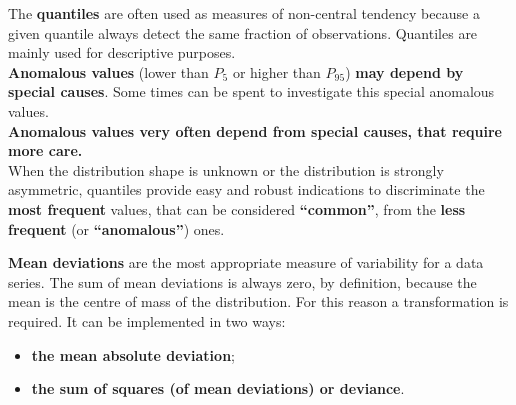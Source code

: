 \begin{frame}
  \begin{small}
    \vspace*{.3cm}
    The \textbf{quantiles} are often used as measures of non-central tendency because a given quantile always detect the same fraction of observations. Quantiles are mainly used for descriptive purposes.\\
    \vspace*{.3cm}
    \textbf{Anomalous values} (lower than $P_5$ or higher than $P_{95}$) \textbf{may depend by special causes}. Some times can be spent to investigate this special anomalous values. \\
    \vspace*{.3cm}
    \textbf{Anomalous values very often depend from special causes, that require more care.}\\
    \vspace*{.3cm}
    When the distribution shape is unknown or the distribution is strongly asymmetric, quantiles provide easy and robust indications to discriminate the \textbf{most frequent} values, that can be considered \textbf{``common''}, from the \textbf{less frequent} (or \textbf{``anomalous''}) ones.
  \end{small}
\end{frame}


\begin{frame}
  \vspace*{.6cm}
  \textbf{Mean deviations} are the most appropriate measure of variability for a data series. The sum of mean deviations is always zero, by definition, because the mean is the centre of mass of the distribution. For this reason a transformation is required. It can be implemented in two ways:\\
  \vspace*{.6cm}
  \begin{itemize}
    \item \textbf{the mean absolute deviation};
    \vspace*{.3cm}
    \item  \textbf{the sum of squares (of mean deviations) or deviance}.
  \end{itemize}
\end{frame}


